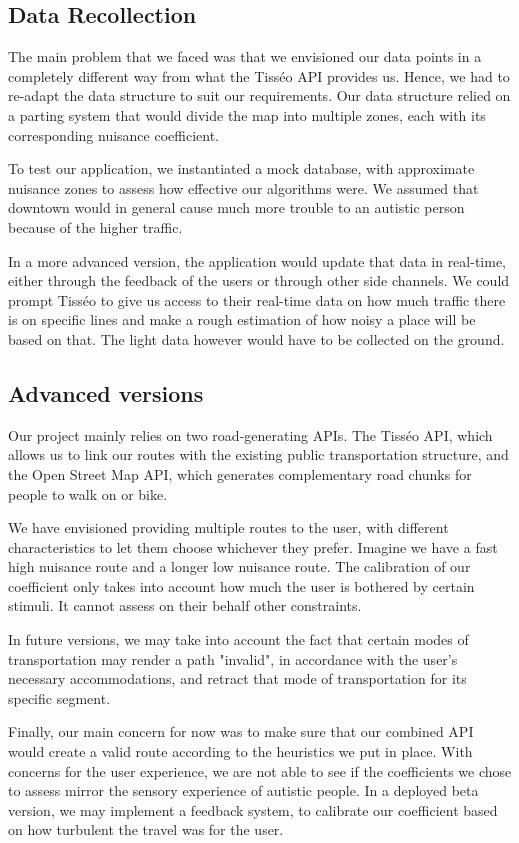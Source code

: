 \subsection{Data Recollection}


The main problem that we faced was that we envisioned our data points in a completely different way from what the Tisséo API provides us. Hence, we had to re-adapt the data structure to suit our requirements. Our data structure relied on a parting system that would divide the map into multiple zones, each with its corresponding nuisance coefficient.


To test our application, we instantiated a mock database, with approximate nuisance zones to assess how effective our algorithms were. We assumed that downtown would in general cause much more trouble to an autistic person because of the higher traffic.


In a more advanced version, the application would update that data in real-time, either through the feedback of the users or through other side channels. We could prompt Tisséo to give us access to their real-time data on how much traffic there is on specific lines and make a rough estimation of how noisy a place will be based on that. The light data however would have to be collected on the ground.


\subsection{Advanced versions}


Our project mainly relies on two road-generating APIs. The Tisséo API, which allows us to link our routes with the existing public transportation structure, and the Open Street Map API, which generates complementary road chunks for people to walk on or bike.


We have envisioned providing multiple routes to the user, with different characteristics to let them choose whichever they prefer. Imagine we have a fast high nuisance route and a longer low nuisance route. The calibration of our coefficient only takes into account how much the user is bothered by certain stimuli. It cannot assess on their behalf other constraints.


In future versions, we may take into account the fact that certain modes of transportation may render a path "invalid", in accordance with the user's necessary accommodations, and retract that mode of transportation for its specific segment.


Finally, our main concern for now was to make sure that our combined API would create a valid route according to the heuristics we put in place. With concerns for the user experience, we are not able to see if the coefficients we chose to assess mirror the sensory experience of autistic people. In a deployed beta version, we may implement a feedback system, to calibrate our coefficient based on how turbulent the travel was for the user.
